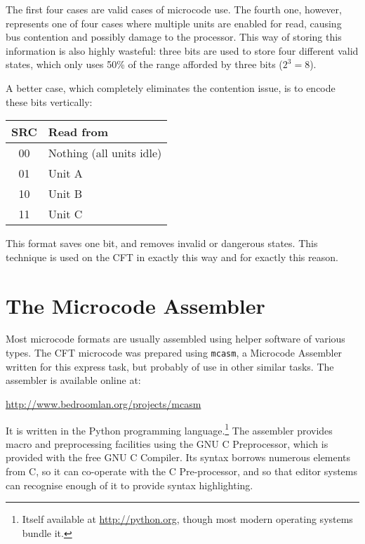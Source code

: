 The first four cases are valid cases of microcode use. The fourth one,
however, represents one of four cases where multiple units are enabled
for read, causing bus contention and possibly damage to the
processor. This way of storing this information is also highly
wasteful: three bits are used to store four different valid states,
which only uses 50\% of the range afforded by three bits ($2^3 = 8$).

A better case, which completely eliminates the contention issue, is to
encode these bits vertically:

\begin{center}
  \zebra
  \begin{tabular}{*{1}{>{\textsf\bgroup}c<{\egroup}}l}
    SRC & Read from\\
    \hline
    00 & Nothing (all units idle)\\
    01 & Unit A\\
    10 & Unit B\\
    11 & Unit C\\
    \hline
  \end{tabular}
\end{center}

This format saves one bit, and removes invalid or dangerous
states. This technique is used on the CFT in exactly this way and for
exactly this reason.


\section{The Microcode Assembler}

Most microcode formats are usually assembled using helper software of
various types.  The CFT microcode was prepared using \texttt{mcasm}, a
Microcode Assembler written for this express task, but probably of use
in other similar tasks. The assembler is available online at:

\begin{center}
  \url{http://www.bedroomlan.org/projects/mcasm}
\end{center}

It is written in the Python programming language.\footnote{Itself available at
  \url{http://python.org}, though most modern operating systems bundle it.} The
assembler provides macro and preprocessing facilities using the GNU C
Preprocessor, which is provided with the free GNU C Compiler. Its syntax
borrows numerous elements from C, so it can co-operate with the C
Pre-processor, and so that editor systems can recognise enough of it to provide
syntax highlighting.

